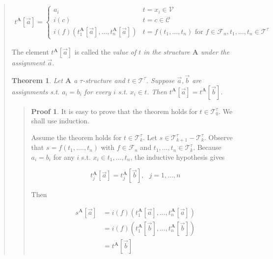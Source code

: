 \documentclass[a4paper, 12pt]{article}
\newtheorem{theorem}{Theorem}
\theoremstyle{definition}
\theoremstyle{definition}
\theoremstyle{definition}
\newtheorem{pro}{Proof}
\begin{document}
\begin{quote}
\begin{align*}
    t^{\textbf{A}}[\overrightarrow{a}] = \begin{cases}
        a_i & t = x_i \in \mathcal{V} \\ 
        i(c) & t = c \in \mathcal{C} \\ 
        i(f)\left( t_1^{\textbf{A}}[\overrightarrow{a}], \ldots, t_n^{\textbf{A}}[\overrightarrow{a}] \right) & t = f(t_1, \ldots, t_n) \text{ for } f \in \mathcal{F}_n, t_1, \ldots, t_n \in \mathcal{T}^\tau
    \end{cases}
\end{align*}

The element $t^{\textbf{A}}[\overrightarrow{a}]$ is called the \textit{value of $t$ in the structure $\textbf{A}$ under 
the assignment $\overrightarrow{a}$}.

\begin{theorem}
    Let $\textbf{A}$ a $\tau$-structure and $t \in \mathcal{T}^\tau$. Suppose
    $\overrightarrow{a}, \overrightarrow{b}$ are assignments s.t. $a_i = b_i$
    for every $i$ s.t. $x_i \in t$. Then $t^{\textbf{A}}[\overrightarrow{a}] =
    t^{\textbf{A}}[\overrightarrow{b}]$.
\end{theorem}


\small
\begin{quote}

\begin{pro}
    It is easy to prove that the theorem holds for $t \in \mathcal{T}_0^{\tau}$. We shall use induction. 

    Assume the theorem holds for $t \in \mathcal{T}_k^\tau$. Let $s \in \mathcal{T}_{k+1}^\tau - \mathcal{T}_k^\tau$.
    Observe that $s = f(t_1, \ldots., t_n)$ with $f \in \mathcal{F}_n$ and 
    $t_1, \ldots, t_n \in \mathcal{T}_k^\tau$. Because $a_i = b_i$ for any 
    $i$ s.t. $x_i \in t_1, \ldots, t_n$, the inductive hypothesis gives 

    \begin{equation*}
        t_j^{\textbf{A}}[\overrightarrow{a}] = t_j^{\textbf{A}}[\overrightarrow{b}], ~ ~ ~ j = 1,\ldots, n
    \end{equation*}

    Then 

    \begin{align*}
        s^{\textbf{A}}[\overrightarrow{a}] &= i(f) \left( t_1^{\textbf{A}}[\overrightarrow{a}], \ldots, t_n^{\textbf{A}}[\overrightarrow{a}] \right)  \\ 
                                           &= i(f) \left( t_1^{\textbf{A}}[\overrightarrow{b}], \ldots, t_n^{\textbf{A}}[\overrightarrow{b}] \right) \\ 
                                           &= t^{\textbf{A}}[\overrightarrow{b}]
    \end{align*}


\end{pro}
\end{quote}
\end{quote}
\end{document}
